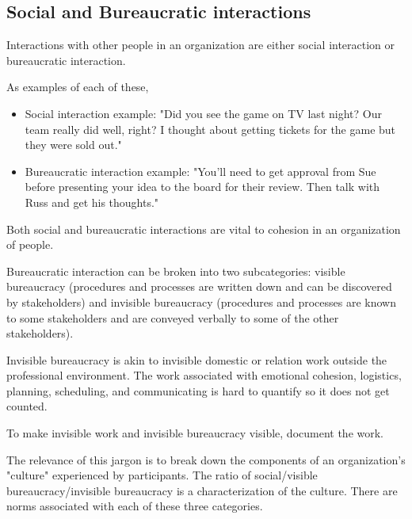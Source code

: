 
\subsection{Social and Bureaucratic interactions}

Interactions with other people in an organization are either social interaction or bureaucratic interaction. 

As examples of each of these,
\begin{itemize}
\item Social interaction example: "Did you see the game on TV last night? Our team really did well, right? I thought about getting tickets for the game but they were sold out."
\item Bureaucratic interaction example: "You'll need to get approval from Sue before presenting your idea to the board for their review. Then talk with Russ and get his thoughts."
\end{itemize}
Both social and bureaucratic interactions are vital to cohesion in an organization of people. 


Bureaucratic interaction can be broken into two subcategories: \gls{visible bureaucracy} (procedures and processes are written down and can be discovered by stakeholders)  and \gls{invisible bureaucracy} (procedures and processes are known to some stakeholders and are conveyed verbally to some of the other stakeholders).

Invisible bureaucracy is akin to invisible domestic or relation work outside the professional environment. The work associated with emotional cohesion, logistics, planning, scheduling, and communicating is hard to quantify so it does not get counted.

To make invisible work and invisible bureaucracy visible, document the work.


The relevance of this jargon is to break down the components of an organization's "culture" experienced by participants. The ratio of social/visible bureaucracy/invisible bureaucracy is a characterization of the culture. There are norms associated with each of these three categories.